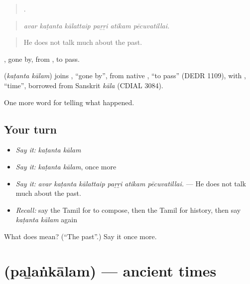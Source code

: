 \begin{quote}
     .
\end{quote}

\begin{quote}
\emph{avar kaṭanta kālattaip paṟṟi atikam pēcuvatillai.}
\end{quote}

\begin{quote}
He does not talk much about the past.
\end{quote}

, gone by, from , to pass.

\begin{cousinweb}
\textbf{ } (\emph{kaṭanta kālam}) joins , \textquotedblleft{}gone by\textquotedblright{}, from native , \textquotedblleft{}to pass\textquotedblright{} (DEDR 1109), with , \textquotedblleft{}time\textquotedblright{}, borrowed from Sanskrit \emph{kāla} (CDIAL 3084).
\end{cousinweb}

\begin{grammarlens}[title={What you've built}]
One more word for telling what happened.
\end{grammarlens}

\subsection*{Your turn}
\begin{itemize}
\raggedright
  \item \emph{Say it:} \emph{kaṭanta kālam}
  \item \emph{Say it:} \emph{kaṭanta kālam}, once more
  \item \emph{Say it:} \emph{avar kaṭanta kālattaip paṟṟi atikam pēcuvatillai.} — He does not talk much about the past.
  \item \emph{Recall:} say the Tamil for to compose, then the Tamil for history, then say \emph{kaṭanta kālam} again
\end{itemize}

\begin{tcolorbox}[breakable,colback=teal!4,colframe=teal!35!black,title={Before you move on}]
What does   mean? (\textquotedblleft{}The past\textquotedblright{}.) Say it once more.
\end{tcolorbox}
\section[\texorpdfstring{\ta{பழங்காலம்} (paḻaṅkālam)}{பழங்காலம் (paḻaṅkālam)}]{ (paḻaṅkālam) — ancient times}

